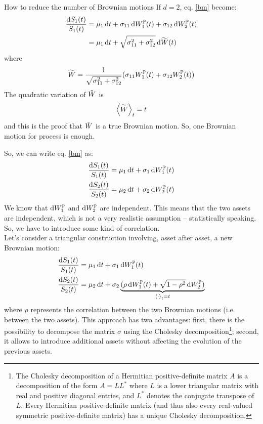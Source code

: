 \begin{example}{How to reduce the number of Brownian motions}{}{}
    If $d=2$, eq. \eqref{bm} become:
    \begin{align}
        \dfrac{\dd S_1(t)}{S_1(t)} &= \mu_1\,\dd t + \sigma_{11}\,\dd W_1^{\mathbb{P}}(t) + \sigma_{12}\,\dd W_2^{\mathbb{P}}(t) \\
        &=
        \mu_1\,\dd t + \sqrt{\sigma_{11}^2 + \sigma_{12}^2}\,\dd \widetilde{W}(t)
    \end{align}
    where 
    \begin{equation}
        \widetilde{W} = \dfrac{1}{\sqrt{\sigma_{11}^2 + \sigma_{12}^2}}(\sigma_{11}W_1^{\mathbb{P}}(t) + \sigma_{12}W_2^{\mathbb{P}}(t))
    \end{equation}
    The quadratic variation of $\Tilde{W}$ is
    \begin{equation}
        \expval{\widetilde{W}}_t = t 
    \end{equation}
    and this is the proof that $\Tilde{W}$ is a true Brownian motion. So, one Brownian motion for process is enough.
\end{example}
So, we can write eq. \eqref{bm} as:
\begin{align}
    \dfrac{\dd S_1(t)}{S_1(t)} &= \mu_1\,\dd t + \sigma_{1}\,\dd W_1^{\mathbb{P}}(t) \\
    \dfrac{\dd S_2(t)}{S_2(t)} &= \mu_2\,\dd t + \sigma_{2}\,\dd W_2^{\mathbb{P}}(t)
\end{align}
We know that $\dd W_1^{\mathbb{P}}$ and $\dd W_2^{\mathbb{P}}$ are independent. This means that the two assets are independent, which is not a very realistic assumption -- statistically speaking. So, we have to introduce some kind of correlation.\\
Let's consider a triangular construction involving, asset after asset, a new Brownian motion:
\begin{align}
    \dfrac{\dd S_1(t)}{S_1(t)} &= \mu_1\,\dd t + \sigma_{1}\,\dd W_1^{\Pmeas}(t) \\
    \dfrac{\dd S_2(t)}{S_2(t)} &= \mu_2\,\dd t + \sigma_{2}\underbrace{(\rho\,\dd W_1^{\Pmeas}(t) + \sqrt{1-\rho^2}\,\dd W_2^{\Pmeas})}_{\expval{\cdot}_t=t} %
\end{align}
where $\rho$ represents the correlation between the two Brownian motions (i.e. between the two assets). This approach has two advantages: first, there is the possibility to decompose the matrix $\sigma$ using the Cholesky decomposition\footnote{The Cholesky decomposition of a Hermitian positive-definite matrix $A$ is a decomposition of the form
$A=LL^*$ where $L$ is a lower triangular matrix with real and positive diagonal entries, and $L^*$ denotes the conjugate transpose of $L$. Every Hermitian positive-definite matrix (and thus also every real-valued symmetric positive-definite matrix) has a unique Cholesky decomposition.}; second, it allows to introduce additional assets without affecting the evolution of the previous assets.

